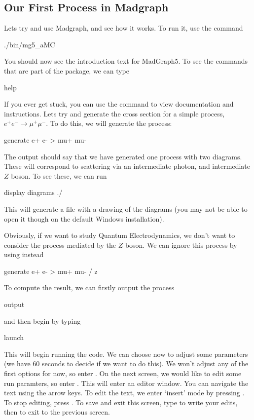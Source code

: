 \subsection*{Our First Process in Madgraph}
Lets try and use Madgraph, and see how it works. To run it, use the command
\begin{codeenv}
    ./bin/mg5_aMC
\end{codeenv}
You should now see the introduction text for MadGraph5. To see the commands that are part of the package, we can type
\begin{codeenv}
    help
\end{codeenv}
If you ever get stuck, you can use the  command to view documentation and instructions.
Lets try and generate the cross section for a simple process, $e^+e^-\to \mu^+\mu^-$. To do this, we will generate the process:
\begin{codeenv}
    generate e+ e- > mu+ mu-
\end{codeenv}
The output should say that we have generated one process with two diagrams. These will correspond to scattering via an intermediate photon, and intermediate $Z$ boson. To see these, we can run
\begin{codeenv}
    display diagrams ./
\end{codeenv}
This  will generate a file with a drawing of the diagrams (you may not be able to open it though on the default Windows installation).

Obviously, if we want to study Quantum Electrodynamics, we don't want to consider the process mediated by the $Z$ boson. We can ignore this process by using instead

\begin{codeenv}
    generate e+ e- > mu+ mu- / z
\end{codeenv}

To compute the result, we can firstly output the process
\begin{codeenv}
    output
\end{codeenv}
and then begin by typing
\begin{codeenv}
    launch
\end{codeenv}
This will begin running the code. We can choose now to adjust some parameters (we have 60 seconds to decide if we want to do this). We won't adjust any of the first options for now, so enter . On the next screen, we would like to edit some run paramters, so enter . This will enter an editor window. You can navigate the text using the arrow keys. To edit the text, we enter `insert' mode by pressing . To stop editing, press . To save and exit this screen, type  to write your edits, then  to exit to the previous screen. 

